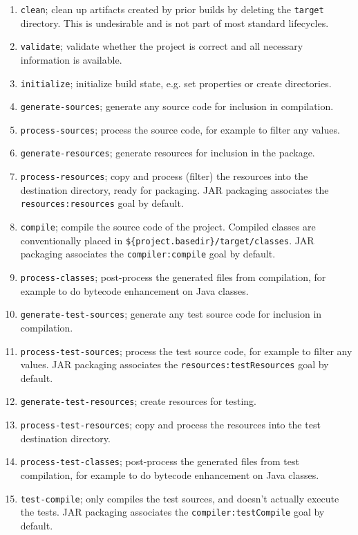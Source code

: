 \documentclass[8pt, table, xcdraw]{article}%
\begin{document}
\begin{enumerate}
    \item \lstinline{clean}; clean up artifacts created by prior builds by deleting the \lstinline{target} directory. This is undesirable and is not part of most standard lifecycles.
    \item \lstinline{validate}; validate whether the project is correct and all necessary information is available.
    \item \lstinline{initialize}; initialize build state, e.g. set properties or create directories.
    \item \lstinline{generate-sources}; generate any source code for inclusion in compilation.
    \item \lstinline{process-sources}; process the source code, for example to filter any values.
    \item \lstinline{generate-resources}; generate resources for inclusion in the package.
    \item \lstinline{process-resources}; copy and process (filter) the resources into the destination directory, ready for packaging. JAR packaging associates the \lstinline{resources:resources} goal by default.
    \item \lstinline{compile}; compile the source code of the project. Compiled classes are conventionally placed in \lstinline|${project.basedir}/target/classes|. JAR packaging associates the \lstinline{compiler:compile} goal by default.
    \item \lstinline{process-classes}; post-process the generated files from compilation, for example to do bytecode enhancement on Java classes.
    \item \lstinline{generate-test-sources}; generate any test source code for inclusion in compilation.
    \item \lstinline{process-test-sources}; process the test source code, for example to filter any values. JAR packaging associates the \lstinline{resources:testResources} goal by default.
    \item \lstinline{generate-test-resources}; create resources for testing.
    \item \lstinline{process-test-resources}; copy and process the resources into the test destination directory.
    \item \lstinline{process-test-classes}; post-process the generated files from test compilation, for example to do bytecode enhancement on Java classes.
    \item \lstinline{test-compile}; only compiles the test sources, and doesn't actually execute the tests. JAR packaging associates the \lstinline{compiler:testCompile} goal by default.

\end{enumerate}
\end{document}
